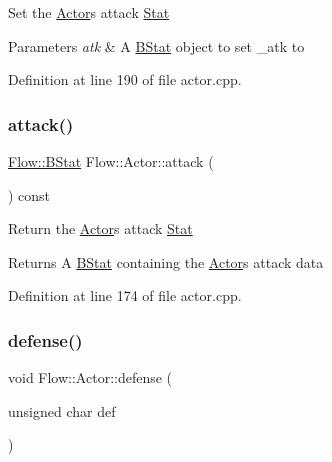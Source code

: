 Set the \hyperlink{class_flow_1_1_actor}{Actor}\textquotesingle{}s attack \hyperlink{class_flow_1_1_stat}{Stat} 
\begin{DoxyParams}{Parameters}
{\em atk} & A \hyperlink{class_flow_1_1_b_stat}{B\+Stat} object to set \+\_\+atk to \\
\hline
\end{DoxyParams}


Definition at line 190 of file actor.\+cpp.

\hypertarget{class_flow_1_1_actor_ab1b5a1e970f6721aeefe580e77d24ddb}{}\label{class_flow_1_1_actor_ab1b5a1e970f6721aeefe580e77d24ddb} 
\subsubsection{\texorpdfstring{attack()}{attack()}\hspace{0.1cm}{\footnotesize\ttfamily [3/3]}}
{\footnotesize\ttfamily \hyperlink{class_flow_1_1_b_stat}{Flow\+::\+B\+Stat} Flow\+::\+Actor\+::attack (\begin{DoxyParamCaption}{ }\end{DoxyParamCaption}) const}

Return the \hyperlink{class_flow_1_1_actor}{Actor}\textquotesingle{}s attack \hyperlink{class_flow_1_1_stat}{Stat} \begin{DoxyReturn}{Returns}
A \hyperlink{class_flow_1_1_b_stat}{B\+Stat} containing the \hyperlink{class_flow_1_1_actor}{Actor}\textquotesingle{}s attack data 
\end{DoxyReturn}


Definition at line 174 of file actor.\+cpp.

\hypertarget{class_flow_1_1_actor_a20e4a2e21e5ba583df61b83770a35033}{}\label{class_flow_1_1_actor_a20e4a2e21e5ba583df61b83770a35033} 
\subsubsection{\texorpdfstring{defense()}{defense()}\hspace{0.1cm}{\footnotesize\ttfamily [1/3]}}
{\footnotesize\ttfamily void Flow\+::\+Actor\+::defense (\begin{DoxyParamCaption}\item[{unsigned char}]{def }\end{DoxyParamCaption})}

